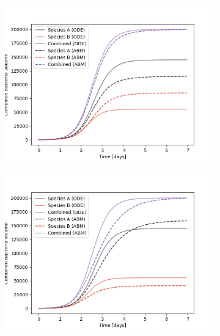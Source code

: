 \documentclass[10pt,A4paper]{article}
\numberwithin{equation}{section}
\begin{document}
\begin{figure}
\begin{subfigure}[c]{0.5\columnwidth}
    \end{subfigure}\\
    \begin{subfigure}[c]{0.5\columnwidth}
        \includegraphics[width=0.9\columnwidth]{Figures/abm-inhomogenous/abm_ode_comparison.png}%
    \end{subfigure}%
    \begin{subfigure}[c]{0.5\columnwidth}
        \includegraphics[width=0.9\columnwidth]{Figures/abm-random/abm_ode_comparison.png}%
    \end{subfigure}
    \caption{
}
\end{figure}
\end{document}
